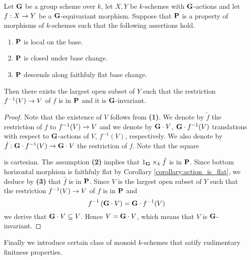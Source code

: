\begin{theorem}\label{theorem:base_locus_of_certain_classes_of_morphisms_are_invariant}
Let $\mathbf{G}$ be a group scheme over $k$, let $X,Y$ be $k$-schemes with $\mathbf{G}$-actions and let $f:X\rightarrow Y$ be a $\mathbf{G}$-equivariant morphism. Suppose that $\mathbf{P}$ is a property of morphisms of $k$-schemes such that the following assertions hold.
\begin{enumerate}[label=\emph{\textbf{(\arabic*)}}, leftmargin=3.0em]
\item $\mathbf{P}$ is local on the base.
\item $\mathbf{P}$ is closed under base change.
\item $\mathbf{P}$ descends along faithfuly flat base change.
\end{enumerate}
Then there exists the largest open subset of $Y$ such that the restriction $f^{-1}(V)\rightarrow V$ of $f$ is in $\mathbf{P}$ and it is $\mathbf{G}$-invariant.
\end{theorem}
\begin{proof}
Note that the existence of $V$ follows from \textbf{(1)}. We denote by $\tilde{f}$ the restriction of $f$ to $f^{-1}(V)\rightarrow V$ and we denote by $\mathbf{G}\cdot V$, $\mathbf{G}\cdot f^{-1}(V)$ translations with respect to $\mathbf{G}$-actions of $V$, $f^{-1}(V)$, respectively. We also denote by $\hat{f}:\mathbf{G}\cdot f^{-1}(V)\rightarrow \mathbf{G}\cdot V$ the restriction of $f$. Note that the square
\begin{center}
\end{center}
is cartesian. The assumption \textbf{(2)} implies that $1_{\mathbf{G}}\times_k\tilde{f}$ is in $\mathbf{P}$. Since bottom horizontal morphism is faithfuly flat by Corollary \ref{corollary:action_is_flat}, we deduce by \textbf{(3)} that $\hat{f}$ is in $\mathbf{P}$. Since $V$ is the largest open subset of $Y$ such that the restriction $f^{-1}(V)\rightarrow V$ of $f$ is in $\mathbf{P}$ and
$$f^{-1}\left(\mathbf{G}\cdot V\right) = \mathbf{G}\cdot f^{-1}(V)$$
we derive that $\mathbf{G}\cdot V \subseteq V$. Hence $V = \mathbf{G}\cdot V$, which means that $V$ is $\mathbf{G}$-invariant.
\end{proof}
\noindent
Finally we introduce certain class of monoid $k$-schemes that satify rudimentary finitness properties.


